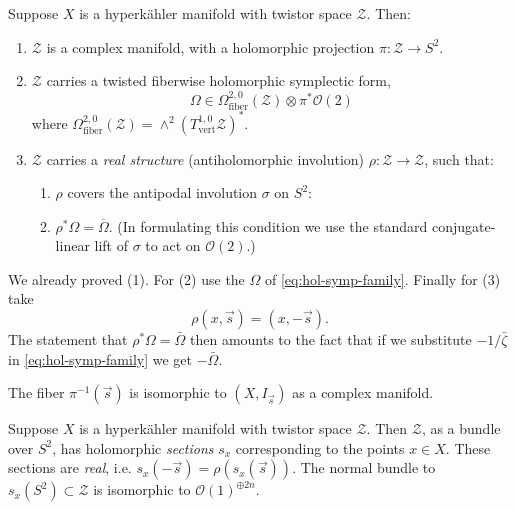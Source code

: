 \documentclass[12pt,letterpaper,reqno]{article}
\numberwithin{equation}{section}
\newcommand{\cZ}{\ensuremath{\mathcal Z}}
\newcommand{\cO}{\ensuremath{\mathcal O}}
\newcommand{\hk}{hyperk\"ahler\xspace}
\newcommand{\fiber}{\mathrm{fiber}}
\newcommand{\rmvert}{\mathrm{vert}}
\newcommand{\ti}[1]{\textit{#1}}
\begin{document}
\begin{prop} \label{prop:twistor-space-properties}
Suppose $X$ is a \hk manifold with twistor space $\cZ$. Then:
\begin{enumerate}
\item $\cZ$ is a complex manifold, with a
  holomorphic projection $\pi: \cZ \to S^2$.
\item $\cZ$ carries a twisted fiberwise holomorphic symplectic form,
\begin{equation}
  \Omega \in \Omega^{2,0}_{\fiber}(\cZ) \otimes \pi^* \cO(2)
\end{equation}
where $\Omega^{2,0}_{\fiber}(\cZ) = \wedge^2 (T^{1,0}_{\rmvert} \cZ)^*$.
\item $\cZ$ carries a \ti{real structure} (antiholomorphic involution)
$\rho: \cZ \to \cZ$, such that:
\begin{enumerate}
\item $\rho$ covers the antipodal involution $\sigma$ on $S^2$:
\begin{center}
\end{center}
\item $\rho^* \Omega = \overline\Omega$.
(In formulating this condition we use the standard
conjugate-linear lift of $\sigma$ to act on $\cO(2)$.)
\end{enumerate}
\end{enumerate}
\end{prop}

\begin{pf}
We already proved (1).
For (2) use the $\Omega$ of \eqref{eq:hol-symp-family}.
Finally for (3) take
\begin{equation}
  \rho(x, \vec s) = (x, - \vec s).
\end{equation}
The statement that $\rho^* \Omega = \bar\Omega$ then
amounts to the fact that if we substitute $- 1 / \bar\zeta$
in \eqref{eq:hol-symp-family} we get $-\bar\Omega$.
\end{pf}

The fiber $\pi^{-1}(\vec s)$ is isomorphic to
$(X,I_{\vec s})$ as a complex manifold.

\begin{prop}
Suppose $X$ is a \hk manifold with twistor space $\cZ$.
Then
$\cZ$, as a bundle over $S^2$,
has holomorphic \ti{sections} $s_x$ corresponding
to the points $x \in X$.
These sections are \ti{real}, i.e. $s_x(-\vec s) = \rho(s_x(\vec s))$.
The normal bundle to $s_x(S^2) \subset \cZ$ is isomorphic
to $\cO(1)^{\oplus 2n}$.
\end{prop}
\end{document}
